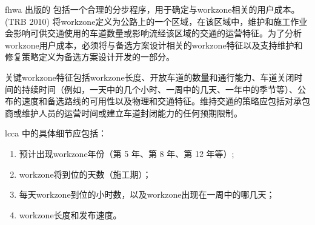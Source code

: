 \acrshort*{fhwa} 出版的  \cite{walls1998l} 包括一个合理的分步程序，用于确定与\gls*{workzone}相关的用户成本。 (TRB 2010) 将\gls*{workzone}定义为公路上的一个区域，在该区域中，维护和施工作业会影响可供交通使用的车道数量或影响流经该区域的交通的运营特征。为了分析\gls*{workzone}用户成本，必须将与备选方案设计相关的\gls*{workzone}特征以及支持维护和修复策略定义为备选方案设计开发的一部分。

关键\gls*{workzone}特征包括\gls*{workzone}长度、开放车道的数量和通行能力、车道关闭时间的持续时间（例如，一天中的几个小时、一周中的几天、一年中的季节等）、公布的速度和备选路线的可用性以及物理和交通特征。维持交通的策略应包括对承包商或维护人员的运营时间或建立车道封闭能力的任何预期限制。

\acrlong*{lcca} 中的具体细节应包括：
\begin{enumerate}
  \item 预计出现\gls*{workzone}年份（第 5 年、第 8 年、第 12 年等）;
  \item \gls*{workzone}将到位的天数（施工期）；
  \item 每天\gls*{workzone}到位的小时数，以及\gls*{workzone}出现在一周中的哪几天；
  \item \gls*{workzone}长度和发布速度。
\end{enumerate}

